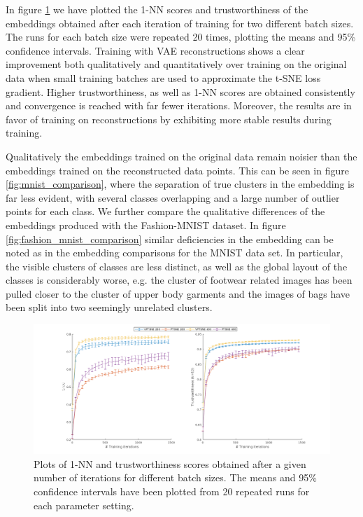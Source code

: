 In figure \ref{fig:mnist_knn_trustworthiness} we have plotted the 1-NN scores and trustworthiness of the embeddings obtained after each iteration of training for two different batch sizes. The runs for each batch size were repeated 20 times, plotting the means and 95\% confidence intervals. Training with VAE reconstructions shows a clear improvement both qualitatively and quantitatively over training on the original data when small training batches are used to approximate the t-SNE loss gradient. Higher trustworthiness, as well as 1-NN scores are obtained consistently and convergence is reached with far fewer iterations. Moreover, the results are in favor of training on reconstructions by exhibiting more stable results during training.

Qualitatively the embeddings trained on the original data remain noisier than the embeddings trained on the reconstructed data points. This can be seen in figure \ref{fig:mnist_comparison}, where the separation of true clusters in the embedding is far less evident, with several classes overlapping and a large number of outlier points for each class. We further compare the qualitative differences of the embeddings produced with the Fashion-MNIST dataset. In figure \ref{fig:fashion_mnist_comparison} similar deficiencies in the embedding can be noted as in the embedding comparisons for the MNIST data set. In particular, the visible clusters of classes are less distinct, as well as the global layout of the classes is considerably worse, e.g. the cluster of footwear related images has been pulled closer to the cluster of upper body garments and the images of bags have been split into two seemingly unrelated clusters.

\begin{figure}[!htb]
  \centering
  \includegraphics[width=\textwidth]{images/learning_curves.png}
  \caption{Plots of 1-NN and trustworthiness scores obtained after a given number of iterations for different batch sizes. The means and 95\% confidence intervals have been plotted from 20 repeated runs for each parameter setting.}
  \label{fig:mnist_knn_trustworthiness}
\end{figure}


